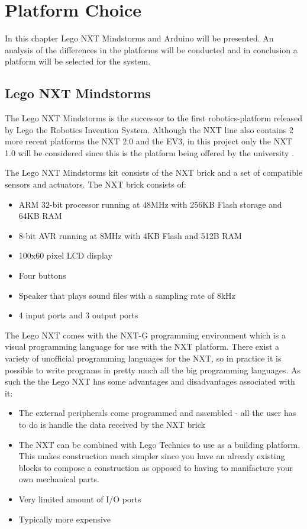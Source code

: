 \chapter{Platform Choice}

In this chapter Lego NXT Mindstorms and Arduino will be presented. An
analysis of the differences in the platforms will be conducted and in
conclusion a platform will be selected for the system.

\section{Lego NXT Mindstorms}
The Lego NXT Mindstorms is the successor to the first robotics-platform released
by Lego the Robotics Invention System. Although the NXT line also contains 2
more recent platforms the NXT 2.0 and the EV3, in this project only the NXT 1.0
will be considered since this is the platform being offered by the university
\Source.\nl

The Lego NXT Mindstorms kit consists of the NXT brick and a set of
compatible sensors and actuators. The NXT brick consists of: \Source
\begin{itemize}
  \item ARM 32-bit processor running at 48MHz with 256KB Flash storage and 64KB RAM
  \item 8-bit AVR running at 8MHz with 4KB Flash and 512B RAM
  \item 100x60 pixel LCD display
  \item Four buttons
  \item Speaker that plays sound files with a sampling rate of 8kHz
  \item 4 input ports and 3 output ports
\end{itemize}

The Lego NXT comes with the NXT-G programming environment which is a visual
programming language for use with the NXT platform. There exist a
variety of unofficial programming languages for the NXT, so in practice it is
possible to write programs in pretty much all the big programming
languages\Source. As such the the Lego NXT has some advantages and disadvantages
associated with it\Source:
\begin{itemize}
  \item The external peripherals come programmed and assembled - all the user
  has to do is handle the data received by the NXT brick
  \item The NXT can be combined with Lego Technics to use as a building
  platform. This makes construction much simpler since you have an already
  existing blocks to compose a construction as opposed to having to manifacture
  your own mechanical parts.
  \item Very limited amount of I/O ports
  \item Typically more expensive
\end{itemize}

